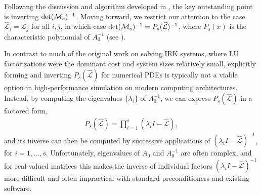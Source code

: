 \documentclass[review]{siamart}
\begin{document}
Following the discussion and algorithm developed in , the key
outstanding point is inverting $\textnormal{det}(\mathcal{M}_s)^{-1}$. Moving forward, we
restrict our attention to the case $\widehat{\mathcal{L}}_i = \widehat{\mathcal{L}}_j$ for all $i,j$,
in which case $\textnormal{det}(\mathcal{M}_s)^{-1} = P_s(\widehat{\mathcal{L}})^{-1}$, where
$P_s(x)$ is the characteristic polynomial of $A_0^{-1}$ (see ).

In contrast to much of the original work on solving IRK systems, where LU factorizations
were the dominant cost and system sizes relatively small, explicitly forming and inverting
$P_s(\widehat{\mathcal{L}})$ for numerical PDEs is typically not a viable option in high-performance
simulation on modern computing architectures. Instead, by computing the eigenvalues
$\{\lambda_i\}$ of $A_0^{-1}$, we can express $P_s(\widehat{\mathcal{L}})$ in a factored form,
%
\begin{align}\label{eq:fac}
P_s(\widehat{\mathcal{L}}) = \prod_{i=1}^s (\lambda_i I - \widehat{\mathcal{L}}),
\end{align}
%
and its inverse can then be computed by successive applications of $(\lambda_iI - \widehat{\mathcal{L}})^{-1}$,
for $i=1,...,s$. Unfortunately, eigenvalues of $A_0$ and $A_0^{-1}$ are often
complex, and for real-valued matrices this makes the inverse of individual factors
$(\lambda_iI - \widehat{\mathcal{L}})^{-1}$ more difficult and often impractical
with standard preconditioners and existing software.
\end{document}
